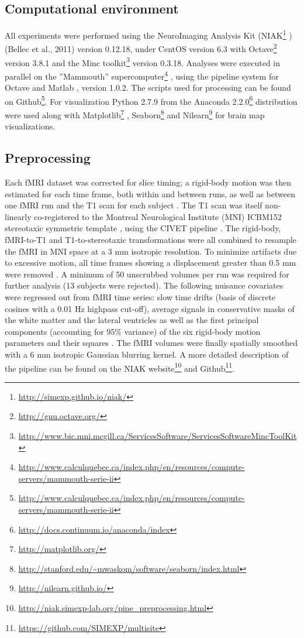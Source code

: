 \documentclass[authoryear]{elsarticle}
\begin{document}
\subsection{Computational environment}
All experiments were performed using the NeuroImaging Analysis Kit (NIAK\footnote{\url{http://simexp.github.io/niak/}} ) (Bellec et al., 2011) version 0.12.18, under CentOS version 6.3 with Octave\footnote{\url{http://gnu.octave.org/}} version 3.8.1 and the Minc toolkit\footnote{\url{http://www.bic.mni.mcgill.ca/ServicesSoftware/ServicesSoftwareMincToolKit}} version 0.3.18. Analyses were executed in parallel on the ”Mammouth” supercomputer\footnote{\url{http://www.calculquebec.ca/index.php/en/resources/compute-servers/mammouth-serie-ii}} , using the pipeline system for Octave and Matlab \citep{Bellec2012}, version 1.0.2. The scripts used for processing can be found on Github\footnote{\url{http://www.calculquebec.ca/index.php/en/resources/compute-servers/mammouth-serie-ii}}. For visualization Python 2.7.9 from the Anaconda 2.2.0\footnote{\url{http://docs.continuum.io/anaconda/index}} distribution were used along with Matplotlib\footnote{\url{http://matplotlib.org/}} \citep{matplotlib}, Seaborn\footnote{\url{http://stanford.edu/~mwaskom/software/seaborn/index.html}} and Nilearn\footnote{\url{http://nilearn.github.io/}} for brain map visualizations.


\subsection{Preprocessing}
Each fMRI dataset was corrected for slice timing; a rigid-body motion was then estimated for each time frame, both within and between runs, as well as between one fMRI run and the T1 scan for each subject \citep{Collins1994}. The T1 scan was itself non-linearly co-registered to the Montreal Neurological Institute (MNI) ICBM152 stereotaxic symmetric template \citep{Fonov2011}, using the CIVET pipeline \citep{Ad-Dab'bagh2006}. The rigid-body, fMRI-to-T1 and T1-to-stereotaxic transformations were all combined to resample the fMRI in MNI space at a 3 mm isotropic resolution. To minimize artifacts due to excessive motion, all time frames showing a displacement greater than 0.5 mm were removed \citep{Power2012}. A minimum of 50 unscrubbed volumes per run was required for further analysis (13 subjects were rejected). The following nuisance covariates were regressed out from fMRI time series: slow time drifts (basis of discrete cosines with a 0.01 Hz highpass cut-off), average signals in conservative masks of the white matter and the lateral ventricles as well as the first principal components (accounting for 95\% variance) of the six rigid-body motion parameters and their squares \citep{Giove2009,Lund2006}. The fMRI volumes were finally spatially smoothed with a 6 mm isotropic Gaussian blurring kernel. A more detailed description of the pipeline can be found on the NIAK website\footnote{\url{http://niak.simexp-lab.org/pipe_preprocessing.html}} and Github\footnote{\url{https://github.com/SIMEXP/multisite}}.
\end{document}
